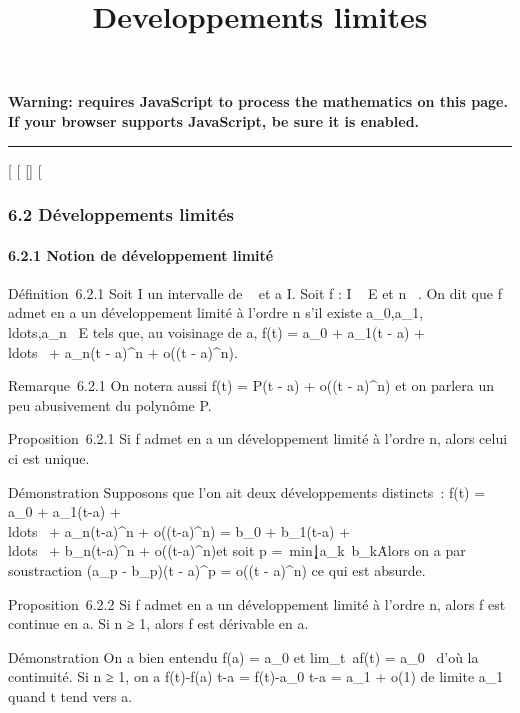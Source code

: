 \documentclass[]{article}
\title{Developpements limites}
\author{}
\date{}
\begin{document}
\maketitle

\textbf{Warning: 
requires JavaScript to process the mathematics on this page.\\ If your
browser supports JavaScript, be sure it is enabled.}

\begin{center}\rule{3in}{0.4pt}\end{center}

{[}
{[}
{[}{]}
{[}

\subsubsection{6.2 Développements limités}

\paragraph{6.2.1 Notion de développement limité}

Définition~6.2.1 Soit I un intervalle de ~ et a \in I. Soit f : I \rightarrow~ E et n
\in {}~. On dit que f admet en a un développement limité à l'ordre n s'il
existe
a\_0,a\_1,\\ldots,a\_n~
\in E tels que, au voisinage de a, f(t) = a\_0 + a\_1(t -
a) + \\ldots~ +
a\_n(t - a)^n + o((t - a)^n).

Remarque~6.2.1 On notera aussi f(t) = P(t - a) + o((t - a)^n)
et on parlera un peu abusivement du polynôme P.

Proposition~6.2.1 Si f admet en a un développement limité à l'ordre n,
alors celui ci est unique.

Démonstration Supposons que l'on ait deux développements distincts~:
f(t) = a\_0 + a\_1(t-a) +
\\ldots~ +
a\_n(t-a)^n + o((t-a)^n) = b\_0 +
b\_1(t-a) +
\\ldots~ +
b\_n(t-a)^n + o((t-a)^n)et soit p
=\
min\k∣a\_k\mathrel\neq~b\_k\.
Alors on a par soustraction (a\_p - b\_p)(t -
a)^p = o((t - a)^n) ce qui est absurde.

Proposition~6.2.2 Si f admet en a un développement limité à l'ordre n,
alors f est continue en a. Si n ≥ 1, alors f est dérivable en a.

Démonstration On a bien entendu f(a) = a\_0 et
lim\_t\rightarrow~af(t) = a\_0~ d'où la
continuité. Si n ≥ 1, on a  f(t)-f(a) \over t-a =
f(t)-a\_0 \over t-a = a\_1 + o(1) de
limite a\_1 quand t tend vers a.
\end{document}

